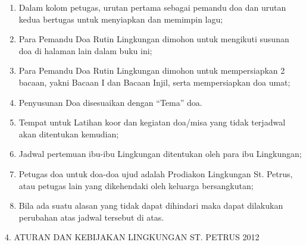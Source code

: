 \documentclass{article}
\begin{document}
\begin{enumerate}
\item Dalam kolom petugas, urutan pertama sebagai pemandu doa dan urutan
kedua bertugas untuk menyiapkan dan memimpin lagu;
\item Para Pemandu Doa Rutin Lingkungan dimohon untuk mengikuti susunan
doa di halaman lain dalam buku ini;
\item Para Pemandu Doa Rutin Lingkungan dimohon untuk mempersiapkan 2
bacaan, yakni Bacaan I dan Bacaan Injil, serta mempersiapkan doa umat;
\item Penyusunan Doa disesuaikan dengan
{\textquotedblleft}Tema{\textquotedblright} doa. 
\item Tempat untuk Latihan koor dan kegiatan doa/misa yang tidak
terjadwal akan ditentukan kemudian;
\item Jadwal pertemuan ibu-ibu Lingkungan ditentukan oleh para ibu
Lingkungan;
\item Petugas doa untuk doa-doa ujud adalah Prodiakon Lingkungan St.
Petrus, atau petugas lain yang dikehendaki oleh keluarga bersangkutan;
\item Bila ada suatu alasan yang tidak dapat dihindari maka dapat
dilakukan perubahan atas jadwal tersebut di atas. 
\end{enumerate}
4.  ATURAN DAN KEBIJAKAN LINGKUNGAN ST. PETRUS 2012 
\end{document}
